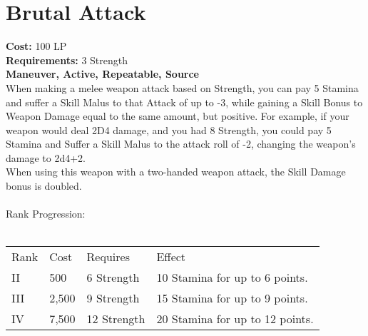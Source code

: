 \section{Brutal Attack}\label{maneuver:brutalAttack}
\textbf{Cost:} 100 LP\\
\textbf{Requirements:} 3 Strength\\
\textbf{Maneuver, Active, Repeatable, Source}\\
When making a melee weapon attack based on Strength, you can pay 5 Stamina and suffer a Skill Malus to that Attack of up to -3, while gaining a Skill Bonus to Weapon Damage equal to the same amount, but positive.
For example, if your weapon would deal 2D4 damage, and you had 8 Strength, you could pay 5 Stamina and Suffer a Skill Malus to the attack roll of -2, changing the weapon's damage to 2d4+2.\\
When using this weapon with a two-handed weapon attack, the Skill Damage bonus is doubled.\\
\\
Rank Progression:\\
\\
\begin{tabular}{l | l | l | l}
	Rank & Cost & Requires & Effect\\
	II & 500 & 6 Strength & 10 Stamina for up to 6 points.\\
	III & 2,500 & 9 Strength & 15 Stamina for up to 9 points.\\
	IV & 7,500 & 12 Strength & 20 Stamina for up to 12 points.\\
\end{tabular}
